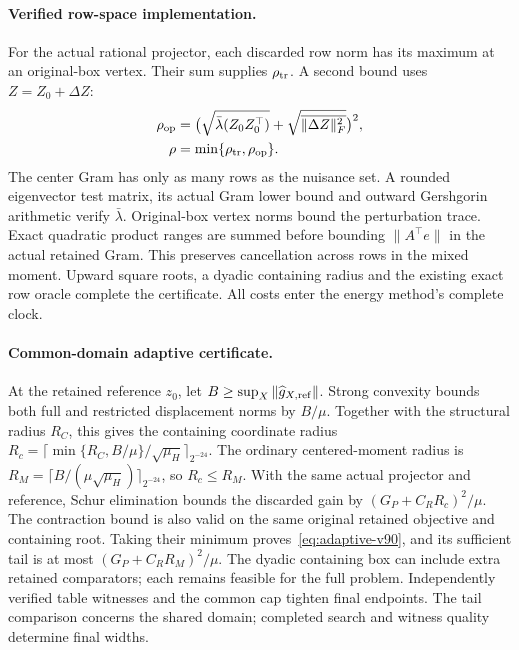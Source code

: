\paragraph{Verified row-space implementation.}
For the actual rational projector, each discarded row norm has its maximum at an original-box vertex. Their sum supplies $\rho_{\rm tr}$. A second bound uses $Z=Z_0+\Delta Z$:
\begin{align*}
 \rho_{\rm op}&=\bigl(\sqrt{\bar\lambda(Z_0Z_0^\top)}+\sqrt{\overline{\|\Delta Z\|_F^2}}\bigr)^2,\\
 \rho&=\min\{\rho_{\rm tr},\rho_{\rm op}\}.
\end{align*}
The center Gram has only as many rows as the nuisance set. A rounded eigenvector test matrix, its actual Gram lower bound and outward Gershgorin arithmetic verify $\bar\lambda$. Original-box vertex norms bound the perturbation trace. Exact quadratic product ranges are summed before bounding $\|A^\top e\|$ in the actual retained Gram. This preserves cancellation across rows in the mixed moment. Upward square roots, a dyadic containing radius and the existing exact row oracle complete the certificate. All costs enter the energy method's complete clock.

\paragraph{Common-domain adaptive certificate.}
At the retained reference $z_0$, let $B\ge\sup_X\|\widehat g_{X,\rm ref}\|$. Strong convexity bounds both full and restricted displacement norms by $B/\mu$. Together with the structural radius $R_C$, this gives the containing coordinate radius $R_c=\lceil\min\{R_C,B/\mu\}/\sqrt{\mu_H}\rceil_{2^{-24}}$. The ordinary centered-moment radius is $R_M=\lceil B/(\mu\sqrt{\mu_H})\rceil_{2^{-24}}$, so $R_c\le R_M$. With the same actual projector and reference, Schur elimination bounds the discarded gain by $(G_P+C_RR_c)^2/\mu$. The contraction bound is also valid on the same original retained objective and containing root. Taking their minimum proves~\eqref{eq:adaptive-v90}, and its sufficient tail is at most $(G_P+C_RR_M)^2/\mu$. The dyadic containing box can include extra retained comparators; each remains feasible for the full problem. Independently verified table witnesses and the common cap tighten final endpoints. The tail comparison concerns the shared domain; completed search and witness quality determine final widths.

